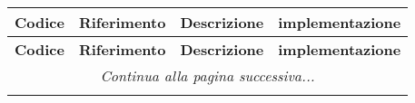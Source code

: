 \documentclass[../piano_di_qualifica.tex]{subfiles}
\begin{document}
\begin{center}
	\begin{longtable}{|c|c|p{8cm}|c|}
		\hline
		\rowcolor{lightgray}
		{\textbf{Codice}} & {\textbf{Riferimento}} & {\textbf{Descrizione}}                                                                                                & {\textbf{implementazione}} \\
		\hline
		\endfirsthead
	
		\hline
		\rowcolor{lightgray}
		{\textbf{Codice}} & {\textbf{Riferimento}} & {\textbf{Descrizione}}                                                                                                & {\textbf{implementazione}} \\
		\hline
		\endhead
		
		\hline
		\multicolumn{4}{|c|}{\emph{Continua alla pagina successiva...}}\\
		\hline
		\endfoot


\end{longtable}
\end{center}
\end{document}
